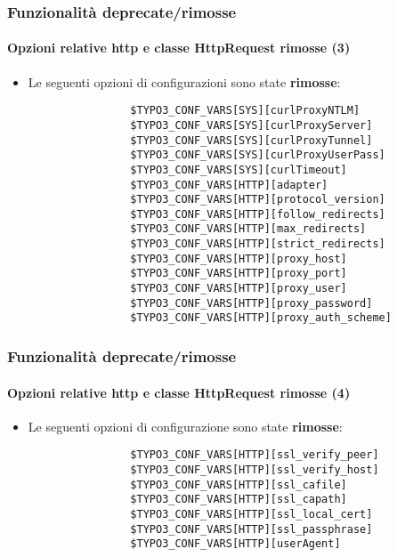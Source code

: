 \begin{frame}[fragile]
	\frametitle{Funzionalità deprecate/rimosse}
	\framesubtitle{Opzioni relative http e classe HttpRequest rimosse (3)}

	\begin{itemize}

		\item Le seguenti opzioni di configurazioni sono state \textbf{rimosse}:
			\begin{lstlisting}
				$TYPO3_CONF_VARS[SYS][curlProxyNTLM]
				$TYPO3_CONF_VARS[SYS][curlProxyServer]
				$TYPO3_CONF_VARS[SYS][curlProxyTunnel]
				$TYPO3_CONF_VARS[SYS][curlProxyUserPass]
				$TYPO3_CONF_VARS[SYS][curlTimeout]
				$TYPO3_CONF_VARS[HTTP][adapter]
				$TYPO3_CONF_VARS[HTTP][protocol_version]
				$TYPO3_CONF_VARS[HTTP][follow_redirects]
				$TYPO3_CONF_VARS[HTTP][max_redirects]
				$TYPO3_CONF_VARS[HTTP][strict_redirects]
				$TYPO3_CONF_VARS[HTTP][proxy_host]
				$TYPO3_CONF_VARS[HTTP][proxy_port]
				$TYPO3_CONF_VARS[HTTP][proxy_user]
				$TYPO3_CONF_VARS[HTTP][proxy_password]
				$TYPO3_CONF_VARS[HTTP][proxy_auth_scheme]
			\end{lstlisting}
	\end{itemize}

\end{frame}


\begin{frame}[fragile]
	\frametitle{Funzionalità deprecate/rimosse}
	\framesubtitle{Opzioni relative http e classe HttpRequest rimosse (4)}

	\begin{itemize}

		\item Le seguenti opzioni di configurazione sono state \textbf{rimosse}:
			\begin{lstlisting}
				$TYPO3_CONF_VARS[HTTP][ssl_verify_peer]
				$TYPO3_CONF_VARS[HTTP][ssl_verify_host]
				$TYPO3_CONF_VARS[HTTP][ssl_cafile]
				$TYPO3_CONF_VARS[HTTP][ssl_capath]
				$TYPO3_CONF_VARS[HTTP][ssl_local_cert]
				$TYPO3_CONF_VARS[HTTP][ssl_passphrase]
				$TYPO3_CONF_VARS[HTTP][userAgent]
			\end{lstlisting}
	\end{itemize}

\end{frame}

